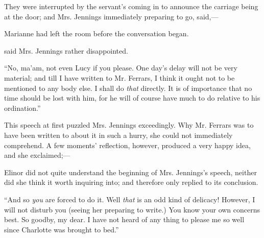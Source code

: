 
They were interrupted by the servant's coming in to announce the carriage being at the door; and Mrs. Jennings immediately preparing to go, said,---


Marianne had left the room before the conversation began.


 said Mrs. Jennings rather disappointed. 

“No, ma'am, not even Lucy if you please. One day's delay will not be very material; and till I have written to Mr. Ferrars, I think it ought not to be mentioned to any body else. I shall do {\em that} directly. It is of importance that no time should be lost with him, for he will of course have much to do relative to his ordination.”

This speech at first puzzled Mrs. Jennings exceedingly. Why Mr. Ferrars was to have been written to about it in such a hurry, she could not immediately comprehend. A few moments' reflection, however, produced a very happy idea, and she exclaimed;---


Elinor did not quite understand the beginning of Mrs. Jennings's speech, neither did she think it worth inquiring into; and therefore only replied to its conclusion.


“And so {\em you} are forced to do it. Well {\em that} is an odd kind of delicacy! However, I will not disturb you (seeing her preparing to write.) You know your own concerns best. So goodby, my dear. I have not heard of any thing to please me so well since Charlotte was brought to bed.”

